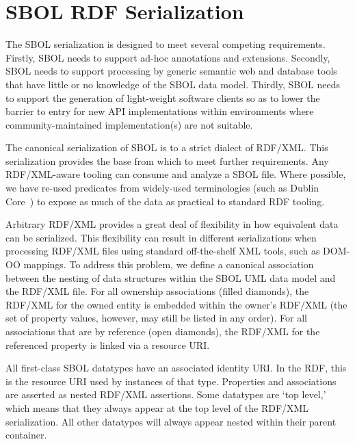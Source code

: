 \section{SBOL RDF Serialization}
\label{sec:serialization}


The SBOL serialization is designed to meet several competing requirements. Firstly, SBOL needs to support ad-hoc annotations and extensions. Secondly, SBOL needs to support processing by generic semantic web and database tools that have little or no knowledge of the SBOL data model. Thirdly, SBOL needs to support the generation of light-weight software clients so as to lower the barrier to entry for new API implementations within environments where community-maintained implementation(s) are not suitable.

The canonical serialization of SBOL is to a strict dialect of RDF/XML. This serialization provides the base from which to meet further requirements. Any RDF/XML-aware tooling can consume and analyze a SBOL file. Where possible, we have re-used predicates from widely-used terminologies (such as Dublin Core~\cite{dcmi2012}) to expose as much of the data as practical to standard RDF tooling.

Arbitrary RDF/XML provides a great deal of flexibility in how equivalent data can be serialized. This flexibility can result in different serializations when processing RDF/XML files using standard off-the-shelf XML tools, such as DOM-OO mappings. 
To address this problem, we define a canonical association between the nesting of data structures within the SBOL UML data model and the RDF/XML file. For all ownership associations (filled diamonds), the RDF/XML for the owned entity is embedded within the owner's RDF/XML (the set of property values, however, may still be listed in any order).
For all associations that are by reference (open diamonds), the RDF/XML for the referenced property is linked via a resource URI.

All first-class SBOL datatypes have an associated identity URI. In the RDF, this is the resource URI used by instances of that type. Properties and associations are asserted as nested RDF/XML assertions. Some datatypes are `top level,' which means that they always appear at the top level of the RDF/XML serialization. All other datatypes will always appear nested within their parent container.

